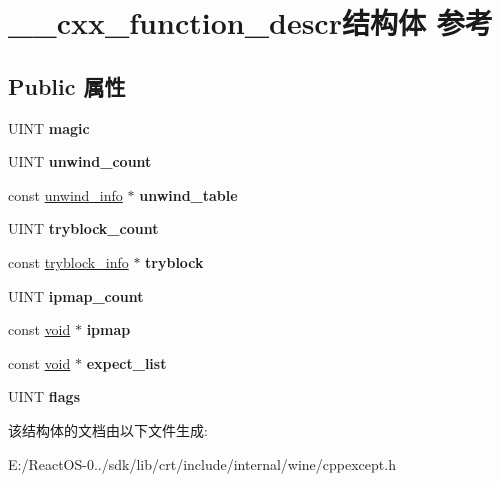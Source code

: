 \hypertarget{struct____cxx__function__descr}{}\section{\+\_\+\+\_\+cxx\+\_\+function\+\_\+descr结构体 参考}
\label{struct____cxx__function__descr}
\subsection*{Public 属性}
\begin{DoxyCompactItemize}
\item 
\mbox{\label{struct____cxx__function__descr_a63caa295c2b21c06cda77e9589ddd934}} 
U\+I\+NT {\bfseries magic}
\item 
\mbox{\label{struct____cxx__function__descr_a2d0f9a5ec531a7cdacc2eacb16d88340}} 
U\+I\+NT {\bfseries unwind\+\_\+count}
\item 
\mbox{\label{struct____cxx__function__descr_aa242cb2c5cd685a2bc6e84fe4fe11a6d}} 
const \hyperlink{struct____unwind__info}{unwind\+\_\+info} $\ast$ {\bfseries unwind\+\_\+table}
\item 
\mbox{\label{struct____cxx__function__descr_a9e25a2fb7163cecaf905e247a8fa9b35}} 
U\+I\+NT {\bfseries tryblock\+\_\+count}
\item 
\mbox{\label{struct____cxx__function__descr_a1fc4f44f36d9ebb53e24d6f39e9e15a2}} 
const \hyperlink{struct____tryblock__info}{tryblock\+\_\+info} $\ast$ {\bfseries tryblock}
\item 
\mbox{\label{struct____cxx__function__descr_a67786d4ddb4e8021f68e78a5b8326712}} 
U\+I\+NT {\bfseries ipmap\+\_\+count}
\item 
\mbox{\label{struct____cxx__function__descr_a4d1982e3b6da0ce7735a6d901ad0ef73}} 
const \hyperlink{interfacevoid}{void} $\ast$ {\bfseries ipmap}
\item 
\mbox{\label{struct____cxx__function__descr_a8bd88e20a0402cb387d4268da1019a50}} 
const \hyperlink{interfacevoid}{void} $\ast$ {\bfseries expect\+\_\+list}
\item 
\mbox{\label{struct____cxx__function__descr_ad3ae37c18c64dc454b98d91d709c9f77}} 
U\+I\+NT {\bfseries flags}
\end{DoxyCompactItemize}


该结构体的文档由以下文件生成\+:\begin{DoxyCompactItemize}
\item 
E\+:/\+React\+O\+S-\/0../sdk/lib/crt/include/internal/wine/cppexcept.\+h\end{DoxyCompactItemize}
